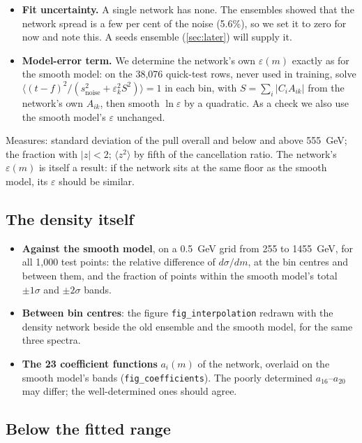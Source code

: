\documentclass[11pt]{article}
\newcommand{\file}[1]{\nolinkurl{#1}}
\newcommand{\snoise}{s_{\text{noise}}}
\begin{document}
\begin{itemize}
  \item \textbf{Fit uncertainty.} A single network has none. The ensembles showed that the network
    spread is a few per cent of the noise (5.6\%), so we set it to zero for now and note this. A
    seeds ensemble (\cref{sec:later}) will supply it.
  \item \textbf{Model-error term.} We determine the network's own $\varepsilon(m)$ exactly as for
    the smooth model: on the 38,076 quick-test rows, never used in training, solve
    $\langle (t-f)^2/(\snoise^2 + \varepsilon_k^2 S^2)\rangle = 1$ in each bin, with
    $S = \sum_i |C_i A_{ik}|$ from the network's own $A_{ik}$, then smooth $\ln\varepsilon$ by a
    quadratic. As a check we also use the smooth model's $\varepsilon$ unchanged.
\end{itemize}
Measures: standard deviation of the pull overall and below and above 555~GeV; the fraction with
$|z|<2$; $\langle z^2\rangle$ by fifth of the cancellation ratio. The network's $\varepsilon(m)$ is
itself a result: if the network sits at the same floor as the smooth model, its $\varepsilon$ should
be similar.

\subsection{The density itself}

\begin{itemize}
  \item \textbf{Against the smooth model}, on a 0.5~GeV grid from 255 to 1455~GeV, for all 1,000 test
    points: the relative difference of $d\sigma/dm$, at the bin centres and between them, and the
    fraction of points within the smooth model's total $\pm1\sigma$ and $\pm2\sigma$ bands.
  \item \textbf{Between bin centres}: the figure \file{fig_interpolation} redrawn with the density
    network beside the old ensemble and the smooth model, for the same three spectra.
  \item \textbf{The 23 coefficient functions} $a_i(m)$ of the network, overlaid on the smooth model's
    bands (\file{fig_coefficients}). The poorly determined $a_{16}$--$a_{20}$ may differ; the
    well-determined ones should agree.
\end{itemize}

\subsection{Below the fitted range}
\end{document}
